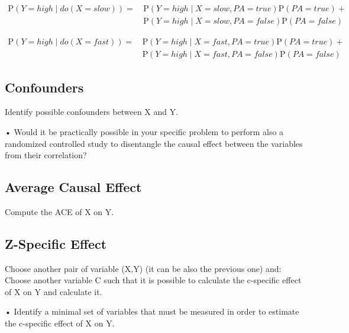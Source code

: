 \documentclass[a4paper,12pt]{article} %
\begin{document}
\begin{equation*}\begin{aligned}
\text{P}(Y = \mathit{high} \mid {do}(X = \mathit{slow})) 
= \, & \text{P}(Y =  \mathit{high} \mid X = \mathit{slow}, PA = \mathit{true})\text{P}(PA = \mathit{true}) +\\
&  \text{P}(Y =  \mathit{high} \mid X = \mathit{slow}, PA = \mathit{false})\text{P}(PA = \mathit{false}) 
\end{aligned}\end{equation*}

\begin{equation*}\begin{aligned}
\text{P}(Y = \mathit{high} \mid {do}(X = \mathit{fast})) 
= \, & \text{P}(Y =  \mathit{high} \mid X = \mathit{fast}, PA = \mathit{true})\text{P}(PA = \mathit{true}) +\\
&  \text{P}(Y =  \mathit{high} \mid X = \mathit{fast}, PA = \mathit{false})\text{P}(PA = \mathit{false}) 
\end{aligned}\end{equation*}


\subsection*{Confounders}

Identify possible confounders between X and Y.



• Would it be practically possible in your specific problem to perform also a randomized controlled study to disentangle the causal effect between the variables from their correlation?

\subsection*{Average Causal Effect}

Compute the ACE of X on Y.

\subsection*{Z-Specific Effect}

Choose another pair of variable (X,Y) (it can be also the previous one) and:
Choose another variable C such that it is possible to calculate the c-specific effect of X on Y and calculate it.


• Identify a minimal set of variables that must be measured in order to estimate the c-specific effect of X on Y.
\end{document}
